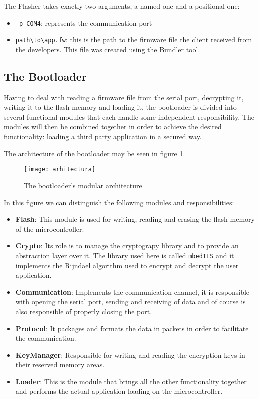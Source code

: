 \documentclass[10pt,a4paper,twoside]{article}
\begin{document}
The Flasher takes exactly two arguments, a named one and a positional one:
\begin{itemize}
\item \texttt{-p COM4}: represents the communication port
\item \texttt{path\textbackslash to\textbackslash app.fw}: this is the path to the firmware file the client received from the developers. This file was created using the Bundler tool.
\end{itemize}

\subsection{The Bootloader}
Having to deal with reading a firmware file from the serial port, decrypting it, writing it to the flash memory and loading it, the bootloader is divided into several functional modules that each handle some independent responsibility. The modules will then be combined together in order to achieve the desired functionality: loading a third party application in a secured way.

The architecture of the bootloader may be seen in figure \ref{architecture}.

\begin{figure}[h]
    \centering
    \texttt{[image: arhitectura]}
    \caption{The bootloader's modular architecture}
    \label{architecture}
\end{figure}

In this figure we can distinguish the following modules and responsibilities:
\begin{itemize}
\item \textbf{Flash}: This module is used for writing, reading and erasing the flash memory of the microcontroller.
\item \textbf{Crypto}: Its role is to manage the cryptograpy library and to provide an abstraction layer over it. The library used here is called \texttt{mbedTLS} and it implements the Rijndael algorithm used to encrypt and decrypt the user application.
\item \textbf{Communication}: Implements the communication channel, it is responsible with opening the serial port, sending and receiving of data and of course is also responsible of properly closing the port.
\item \textbf{Protocol}: It packages and formats the data in packets in order to facilitate the communication.
\item \textbf{KeyManager}: Responsible for writing and reading the encryption keys in their reserved memory areas.
\item \textbf{Loader}: This is the module that brings all the other functionality together and performs the actual application loading on the microcontroller.
\end{itemize}
\end{document}
